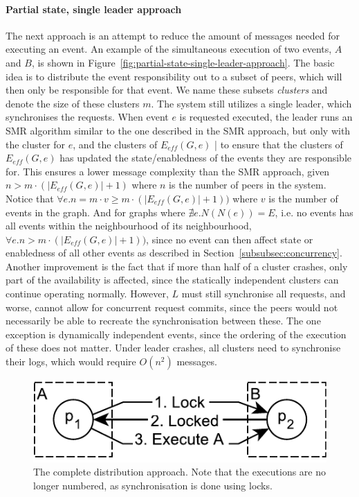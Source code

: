 \documentclass{article}
\begin{document}
	\paragraph{Partial state, single leader approach}
	The next approach is an attempt to reduce the amount of messages needed for executing an event.
    An example of the simultaneous execution of two events, $A$ and $B$, is shown in Figure~\ref{fig:partial-state-single-leader-approach}.
	The basic idea is to distribute the event responsibility out to a subset of peers, which will then only be responsible for that event.
	We name these subsets \textit{clusters} and denote the size of these clusters $m$.
	The system still utilizes a single leader, which synchronises the requests.
	When event $e$ is requested executed, the leader runs an SMR algorithm similar to the one described in the SMR approach, but only with the cluster for $e$, and the clusters of $E_{eff}(G,e)$ | to ensure that the clusters of $E_{eff}(G,e)$ has updated the state/enabledness of the events they are responsible for.
	This ensures a lower message complexity than the SMR approach, given $n > m \cdot (|E_{eff}(G,e)|+1)$ where $n$ is the number of peers in the system.
	Notice that $\forall e. n = m \cdot v \geq m \cdot (|E_{eff}(G,e)|+1))$ where $v$ is the number of events in the graph.
	And for graphs where $\nexists e. N(N(e)) = E$, i.e. no events has all events within the neighbourhood of its neighbourhood, $\forall e. n > m \cdot (|E_{eff}(G,e)|+1))$, since no event can then affect state or enabledness of all other events as described in Section~\ref{subsubsec:concurrency}.
	Another improvement is the fact that if more than half of a cluster crashes, only part of the availability is affected, since the statically independent clusters can continue operating normally.
	However, $L$ must still synchronise all requests, and worse, cannot allow for concurrent request commits, since the peers would not necessarily be able to recreate the synchronisation between these.
	The one exception is dynamically independent events, since the ordering of the execution of these does not matter.
	Under leader crashes, all clusters need to synchronise their logs, which would require $O(n^2)$ messages.

    \FloatBarrier
    \begin{figure}[ht!]
        \center
        \includegraphics[scale=0.7]{figures/dcr-graphs/complete-distribution-approach.pdf}
        \caption{The complete distribution approach.
        Note that the executions are no longer numbered, as synchronisation is done using locks.}
        \label{fig:complete-distribution-approach}
    \end{figure}
    \FloatBarrier
\end{document}
